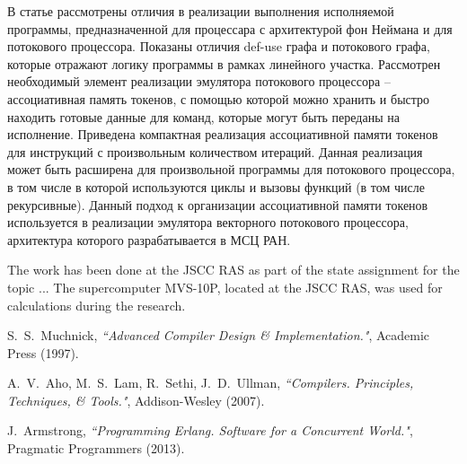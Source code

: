 \documentclass[
11pt,%
tightenlines,%
twoside,%
onecolumn,%
nofloats,%
nobibnotes,%
nofootinbib,%
superscriptaddress,%
noshowpacs,%
centertags]%
{revtex4}
\begin{document}
В статье рассмотрены отличия в реализации выполнения исполняемой программы, предназначенной для процессара с архитектурой фон Неймана и для потокового процессора.
Показаны отличия def-use графа и потокового графа, которые отражают логику программы в рамках линейного участка.
Рассмотрен необходимый элемент реализации эмулятора потокового процессора -- ассоциативная память токенов, с помощью которой можно хранить и быстро находить готовые данные для команд, которые могут быть переданы на исполнение.
Приведена компактная реализация ассоциативной памяти токенов для инструкций с произвольным количеством итераций.
Данная реализация может быть расширена для произвольной программы для потокового процессора, в том числе в которой используются циклы и вызовы функций (в том числе рекурсивные).
Данный подход к организации ассоциативной памяти токенов используется в реализации эмулятора векторного потокового процессора, архитектура которого разрабатывается в МСЦ РАН.

\begin{acknowledgments}
The work has been done at the JSCC RAS as part of the state assignment for the topic ... The supercomputer MVS-10P, located at the JSCC RAS, was used for calculations during the research.
\end{acknowledgments}

\begin{thebibliography}{99}

S.~S.~Muchnick, {\it ``Advanced Compiler Design \& Implementation."}, Academic Press (1997).

A.~V.~Aho, M.~S.~Lam, R.~Sethi, J.~D.~Ullman, {\it ``Compilers. Principles, Techniques, \& Tools."}, Addison-Wesley (2007).

J.~Armstrong, {\it ``Programming Erlang. Software for a Concurrent World."}, Pragmatic Programmers (2013).

\end{thebibliography}
\end{document}
